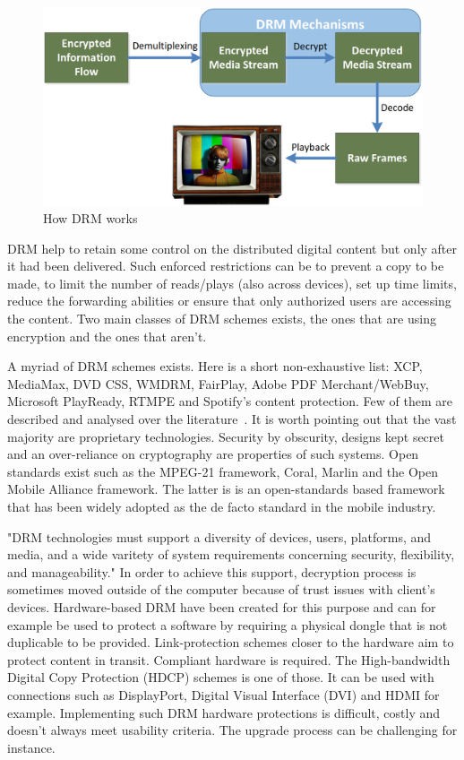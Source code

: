 \documentclass[11pt, twocolumn]{article}
\begin{document}
\begin{figure}[ht]
	\centering
	\includegraphics[scale=0.18]{images/HowDRMWorks.png}
	\caption{How DRM works}
	\label{fig:drm}
\end{figure}

DRM help to retain some control on the distributed digital content but only after it had been delivered.
Such enforced restrictions can be to prevent a copy to be made, to limit the number of reads/plays (also across devices), set up time limits, reduce the forwarding abilities or ensure that only authorized users are accessing the content.
Two main classes of DRM schemes exists, the ones that are using encryption and the ones that aren't.

A myriad of DRM schemes exists.
Here is a short non-exhaustive list: XCP, MediaMax, DVD CSS, WMDRM, FairPlay, Adobe PDF Merchant/WebBuy, Microsoft PlayReady, RTMPE and Spotify's content protection.
Few of them are described and analysed over the literature~\cite{Wang:2013}\cite{Michiels:2005}\cite{Halderman:2006}.
It is worth pointing out that the vast majority are proprietary technologies.
Security by obscurity, designs kept secret and an over-reliance on cryptography are properties of such systems.
Open standards exist such as the MPEG-21 framework, Coral, Marlin and the Open Mobile Alliance framework.
The latter is is an open-standards based framework that has been widely adopted as the de facto standard in the mobile industry.

"DRM technologies must support a diversity of devices, users, platforms, and media, and a wide varitety of system requirements concerning security, flexibility, and manageability."\cite{Michiels:2005}
In order to achieve this support, decryption process is sometimes moved outside of the computer because of trust issues with client's devices.
Hardware-based DRM have been created for this purpose and can for example be used to protect a software by requiring a physical dongle that is not duplicable to be provided.
Link-protection schemes closer to the hardware aim to protect content in transit.
Compliant hardware is required.
The High-bandwidth Digital Copy Protection (HDCP) schemes is one of those.
It can be used with connections such as DisplayPort, Digital Visual Interface (DVI) and HDMI for example.
Implementing such DRM hardware protections is difficult, costly and doesn't always meet usability criteria.
The upgrade process can be challenging for instance.
\end{document}
